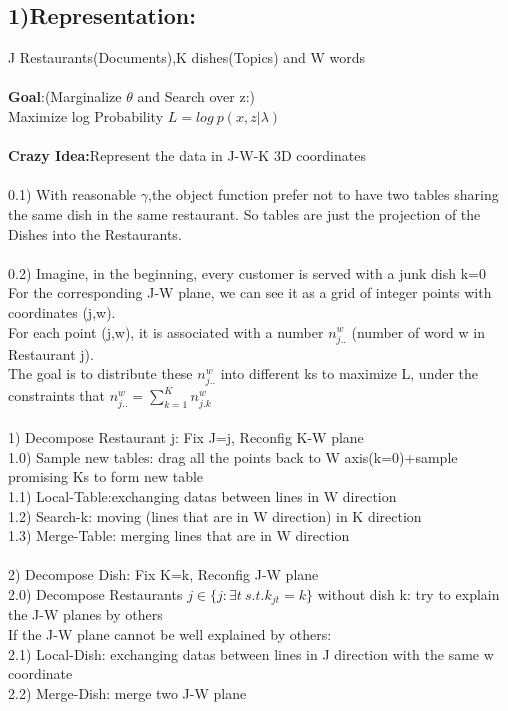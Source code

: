 \documentclass{article}
\begin{document}
\begin{spacing}{1.1}
\section{1)Representation:}
J Restaurants(Documents),K dishes(Topics) and W words\\ \\
{\bf Goal}:(Marginalize $\theta$ and Search over z:)\\
 Maximize log Probability $L=log \ p(x,z|\lambda)$ \\ \\
{\bf Crazy Idea:}Represent the data in J-W-K 3D coordinates\\ \\
0.1) With reasonable $\gamma$,the object function prefer not to have two tables sharing the same dish in the same restaurant. So tables are just the 
projection of the Dishes into the Restaurants.\\ \\
0.2) Imagine, in the beginning, every customer is served with a junk dish k=0\\
For the corresponding J-W plane, we can see it as a grid of integer points with coordinates (j,w).\\
For each point (j,w), it is associated with a number $n_{j..}^{w}$ (number of word w in Restaurant j).\\ 
The goal is to distribute these $n_{j..}^{w}$ into different ks to maximize L, under the constraints that $n_{j..}^{w}=\sum_{k=1}^{K}n_{j.k}^{w}$\\ \\ 
1) Decompose Restaurant j: Fix J=j, Reconfig K-W plane\\ 
1.0) Sample new tables: drag all the points back to W axis(k=0)+sample promising Ks to form new table\\
1.1) Local-Table:exchanging datas between lines in W direction\\
1.2) Search-k: moving (lines that are in W direction) in K direction\\
1.3) Merge-Table: merging lines that are in W direction\\ \\
2) Decompose Dish: Fix K=k, Reconfig J-W plane\\ 
2.0) Decompose Restaurants $j\in\{j: \exists t\ s.t. k_{jt}=k\}$ without dish k: try to explain the J-W planes by others\\
If the J-W plane cannot be well explained by others:\\
2.1) Local-Dish: exchanging datas between lines in J direction with the same w coordinate\\
2.2) Merge-Dish: merge two J-W plane\\

\end{spacing}
\end{document}
